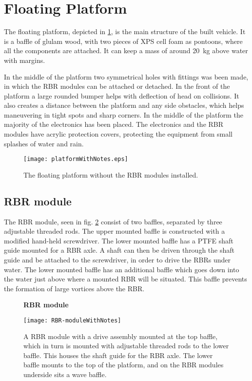 \section{Floating Platform}
The floating platform, depicted in
\cref{fig:floatingPlatform}, is the main structure of the built vehicle.
It is a baffle of glulam wood, with two pieces of XPS cell foam as
pontoons, where all the components are attached. It can keep a mass of
around 20~kg above water with margins.

In the middle of the platform two symmetrical holes with fittings was
been made, in which the RBR modules can be attached or detached. In the front of the platform a large rounded bumper helps with deflection of head on collisions. It also creates a distance between the platform and
any side obstacles, which helps maneuvering in tight spots and sharp corners. In the
middle of the platform the majority of the electronics has been placed. The electronics and the RBR modules have acrylic
protection covers, protecting the equipment from small splashes of water and rain.

\begin{figure}[h]
   \centering
   \texttt{[image: platformWithNotes.eps]}
   \caption{The floating platform without the RBR modules installed.}
   \label{fig:floatingPlatform}
\end{figure}

\subsection{RBR module}
The RBR module, seen in fig. \ref{fig:rbr-module} consist of two baffles, separated by three adjustable threaded
rods. The upper mounted baffle is constructed with a modified hand-held screwdriver. The lower mounted
baffle has a PTFE shaft guide mounted for a RBR axle. A shaft can then be driven through the shaft guide and be attached to the screwdriver, in order to drive the RBRs under water. The lower mounted baffle has an
additional baffle which goes down into the water just above where a mounted RBR
will be situated. This baffle prevents the formation of large vortices above the RBR. 

\begin{figure}[H]
  \centering
  \textbf{RBR module}
  \par\medskip
  \texttt{[image: RBR-moduleWithNotes]}
  \caption{A RBR module with a drive assembly mounted at the top baffle,
    which in turn is mounted with adjustable threaded rods to the lower baffle. This houses the shaft guide for the RBR axle. The lower baffle mounts to the
    top of the platform, and on the RBR modules underside sits a wave baffle.}\label{fig:rbr-module}
\end{figure}

